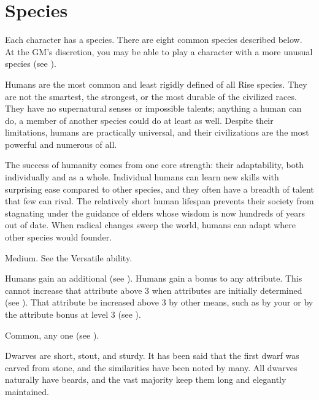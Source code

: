 \chapter{Species}\label{Species}
Each character has a species.
There are eight common species described below.
At the GM's discretion, you may be able to play a character with a more unusual species (see ).


  Humans are the most common and least rigidly defined of all Rise species.
  They are not the smartest, the strongest, or the most durable of the civilized races.
  They have no supernatural senses or impossible talents; anything a human can do, a member of another species could do at least as well.
  Despite their limitations, humans are practically universal, and their civilizations are the most powerful and numerous of all.

  The success of humanity comes from one core strength: their adaptability, both individually and as a whole.
  Individual humans can learn new skills with surprising ease compared to other species, and they often have a breadth of talent that few can rival.
  The relatively short human lifespan prevents their society from stagnating under the guidance of elders whose wisdom is now hundreds of years out of date.
  When radical changes sweep the world, humans can adapt where other species would founder.

   Medium.
   See the Versatile ability.
  \begin{raggeditemize}
     Humans gain an additional  (see ).
     Humans gain a  bonus to any attribute.
      This cannot increase that attribute above 3 when attributes are initially determined (see ).
      That attribute be increased above 3 by other means, such as by your  or by the attribute bonus at level 3 (see ).
  \end{raggeditemize}
   Common, any one  (see ).


  Dwarves are short, stout, and sturdy.
  It has been said that the first dwarf was carved from stone, and the similarities have been noted by many.
  All dwarves naturally have beards, and the vast majority keep them long and elegantly maintained.

